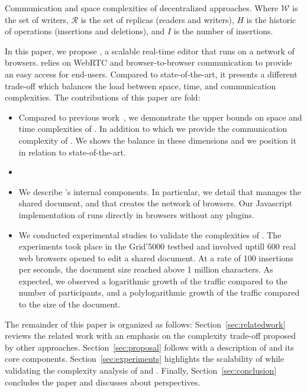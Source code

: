 \begin{table*}[t]
  \centering
  
  \caption{\label{table:complexities}
    Communication and space complexities of decentralized approaches.
    Where $\mathcal{W}$ is the set of writers, 
    $\mathcal{R}$ is the set of replicas (readers and writers),
    $H$ is the historic of operations (insertions and deletions),
    and $I$ is the number of insertions.}
\end{table*}


In this paper, we propose \CRATE, a scalable real-time editor that runs on a
network of browsers. \CRATE relies on WebRTC and browser-to-browser
communication to provide an easy access for end-users. Compared to
state-of-the-art, it presents a different trade-off which balances the load
between space, time, and communication complexities. The contributions of this
paper are fold:
\begin{itemize}
\item Compared to previous work~\cite{nedelec2013lseq}, we demonstrate the upper
  bounds on space and time complexities of \LSEQ. In addition to which we
  provide the communication complexity of \CRATE. We shows the balance in these
  dimensions and we position it in relation to state-of-the-art.
\item {}
\item We describe \CRATE's internal components. In particular, we detail \LSEQ
  that manages the shared document, and \SPRAY that creates the network of
  browsers. Our Javascript implementation of \CRATE runs directly in browsers
  without any plugins.
\item We conducted experimental studies to validate the complexities of
  \CRATE. The experiments took place in the Grid'5000 testbed and involved
  uptill $600$ real web browsers opened to edit a shared document. At a rate of
  100 insertions per seconds, the document size reached above 1 million
  characters. As expected, we observed a logarithmic growth of the traffic
  compared to the number of participants, and a polylogarithmic growth of the
  traffic compared to the size of the document.
\end{itemize}

The remainder of this paper is organized as follows:
Section~\ref{sec:relatedwork} reviews the related work with an emphasis on the
complexity trade-off proposed by other approaches. Section~\ref{sec:proposal}
follows with a description of \CRATE and its core
components. Section~\ref{sec:experiments} highlights the scalability of \CRATE
while validating the complexity analysis of \LSEQ and \SPRAY. Finally,
Section~\ref{sec:conclusion} concludes the paper and discusses about
perspectives.

